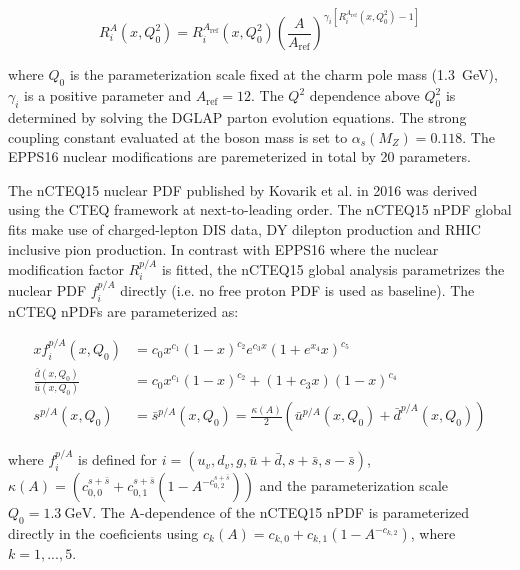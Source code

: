\begin{equation}
  R^{A}_{i}\left(x,Q^{2}_{0}\right) = R^{A_{\mathrm{ref}}}_{i}\left(x,Q^{2}_{0}\right)\left(\frac{A}{A_{\mathrm{ref}}}\right)^{\gamma_{i}\left[R_{i}^{A_{\mathrm{ref}}}\left(x,Q^{2}_{0}\right) - 1\right]}
\end{equation}

where $Q_{0}$ is the parameterization scale fixed at the charm pole mass (\SI{1.3}{\GeV}), $\gamma_{i}$ is a positive parameter and $A_{\mathrm{ref}}=12$. The $Q^{2}$ dependence above $Q^{2}_{0}$ is determined by solving the DGLAP parton evolution equations. The strong coupling constant evaluated at the {\PZ} boson mass is set to $\alpha_{s}\left(M_{Z}\right)=0.118$. The EPPS16 nuclear modifications are paremeterized in total by 20 parameters.

The nCTEQ15 nuclear PDF published by Kovarik et al. in 2016 was derived using the CTEQ framework at next-to-leading order. The nCTEQ15 nPDF global fits make use of charged-lepton DIS data, DY dilepton production and RHIC inclusive pion production. In contrast with EPPS16 where the nuclear modification factor $R_{i}^{p/A}$ is fitted, the nCTEQ15 global analysis parametrizes  the nuclear PDF $f_{i}^{p/A}$ directly (i.e. no free proton PDF is used as baseline). The nCTEQ nPDFs are parameterized as:

\begin{equation}
  \begin{alignedat}{1}
    xf_{i}^{p/A}\left(x,Q_{0}\right) &= c_{0}x^{c_{1}}\left(1-x\right)^{c_{2}}e^{c_{3}x}\left(1+e^{x_{4}}x\right)^{c_{5}} \\
    \frac{\bar{d}\left(x,Q_{0}\right)}{\bar{u}\left(x,Q_{0}\right)} &= c_{0}x^{c_{1}}\left(1-x\right)^{c_{2}} + \left(1+c_{3}x\right)\left(1-x\right)^{c_{4}} \\
    s^{p/A}\left(x,Q_{0}\right) &= \bar{s}^{p/A}\left(x,Q_{0}\right) = \frac{\kappa\left(A\right)}{2}\left(\bar{u}^{p/A}\left(x,Q_{0}\right) + \bar{d}^{p/A}\left(x,Q_{0}\right)\right)
  \end{alignedat}
\end{equation}

where $f_{i}^{p/A}$ is defined for $i = \left(u_{v} , d_{v} , g , \bar{u}+\bar{d} , s+\bar{s} , s-\bar{s}\right)$, $\kappa\left(A\right)=\left(c^{s+\bar{s}}_{0,0} + c^{s+\bar{s}}_{0,1}\left(1-A^{-c^{s+\bar{s}}_{0,2}}\right)\right)$ and the parameterization scale $Q_{0} = \SI{1.3}{\GeV}$. The A-dependence of the nCTEQ15 nPDF is parameterized directly in the coeficients using $c_{k}\left(A\right) = c_{k,0} + c_{k,1}\left(1-A^{-c_{k,2}}\right)$, where $k=1,...,5$.

